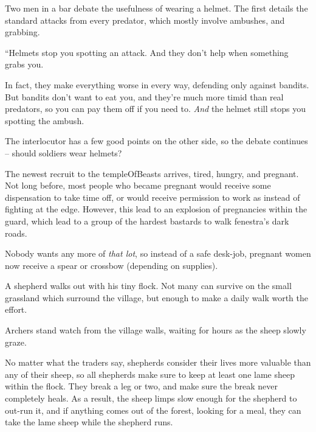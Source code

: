 \begin{multicols}{2}
\begin{exampletext}
  Two men in a bar debate the usefulness of wearing a helmet.
  The first details the standard attacks from every predator, which mostly involve ambushes, and grabbing.

  \begin{speechtext}
    ``Helmets stop you spotting an attack.
    And they don't help when something grabs you.

    In fact, they make everything worse in every way, defending only against bandits.
    But bandits don't want to eat you, and they're much more timid than real predators, so you can pay them off if you need to.
    \emph{And} the helmet still stops you spotting the ambush.
  \end{speechtext}

  The interlocutor has a few good points on the other side, so the debate continues -- should soldiers wear helmets?
\end{exampletext}

\begin{exampletext}
  The newest recruit to the \gls{templeOfBeasts} arrives, tired, hungry, and pregnant.
  Not long before, most people who became pregnant would receive some dispensation to take time off, or would receive permission to work as  instead of fighting at the \gls{edge}.
  However, this lead to an explosion of pregnancies within the \gls{guard}, which lead to a group of the hardest bastards to walk \gls{fenestra}'s dark roads.

  Nobody wants any more of \emph{that lot}, so instead of a safe desk-job, pregnant women now receive a spear or crossbow (depending on supplies).
\end{exampletext}

\begin{exampletext}
  A shepherd walks out with his tiny flock.
  Not many can survive on the small grassland which surround the \gls{village}, but enough to make a daily walk worth the effort.

  Archers stand watch from the \gls{village} walls, waiting for hours as the sheep slowly graze.

  No matter what the traders say, shepherds consider their lives more valuable than any of their sheep, so all shepherds make sure to keep at least one lame sheep within the flock.
  They break a leg or two, and make sure the break never completely heals.
  As a result, the sheep limps slow enough for the shepherd to out-run it, and if anything comes out of the forest, looking for a meal, they can take the lame sheep while the shepherd runs.
\end{exampletext}


\end{multicols}
